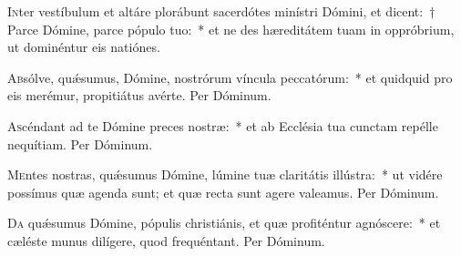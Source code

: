 \documentclass[vesperale_romanum.tex]{subfiles}
\begin{document}

\newpage
{}


\lettrine{I}{n}ter vestíbulum et altáre plorábunt sacerdótes minístri Dómini, et dicent:~† Parce Dómine, parce pópulo tuo:~* et ne des hæreditátem tuam in oppróbrium, ut dominéntur eis natiónes.





\oratio

\lettrine{A}{b}sólve, quǽsumus, Dómine, nostrórum víncula peccatórum:~* et quidquid pro eis merémur, propitiátus avérte.
Per Dóminum.



\oratio

\lettrine{A}{s}céndant ad te Dómine preces nostræ:~* et ab Ecclésia tua cun\-ctam repélle nequítiam. Per Dóminum.



\oratio

\lettrine{M}{e}ntes nostras, quǽsumus Dómine, lúmine tuæ claritátis illústra:~* ut vidére possímus quæ agenda sunt; et quæ recta sunt agere valeamus. Per Dóminum.



\oratio

\lettrine{D}{a} quǽsumus Dómine, pópulis christiánis, et quæ profiténtur agnóscere:~* et cæléste munus dilígere, quod frequéntant. Per Dóminum.


\end{document}
